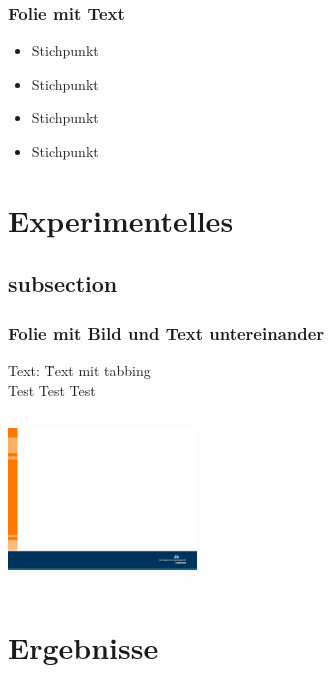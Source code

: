 \begin{frame}
	\frametitle{Folie mit Text}
	\vskip5mm
	\vspace{-0.4cm}%
	\begin{itemize}
		\item Stichpunkt\newline
		\item Stichpunkt\newline
		\item Stichpunkt\newline
		\item Stichpunkt\newline
	\end{itemize}
\end{frame}

\section{Experimentelles}
\subsection{subsection}
\begin{frame}
\frametitle{Folie mit Bild und Text untereinander}
\begin{tabbing}
	Text: \qquad \= Text mit tabbing\\
	\> Test Test Test\\
\end{tabbing}
	\vskip5mm
	\begin{columns}
		\column{12cm}
		\centering
		\includegraphics[width=5.0cm]{style/images/master_background}\\
	\end{columns}
\end{frame}

\section{Ergebnisse}
